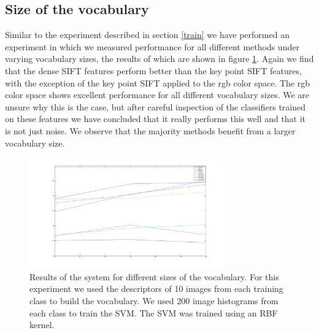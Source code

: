 \documentclass[11pt]{article}
\begin{document}
\subsection{Size of the vocabulary}
Similar to the experiment described in section \ref{train} we have performed an experiment in which we measured performance for all different methods under varying vocabulary sizes, the results of which are shown in figure \ref{vocabularySizes}. Again we find that the dense SIFT features perform better than the key point SIFT features, with the exception of the key point SIFT applied to the rgb color space. The rgb color space shows excellent performance for all different vocabulary sizes. We are unsure why this is the case, but after careful inspection of the classifiers trained on these features we have concluded that it really performs this well and that it is not just noise. We observe that the majority methods benefit from a larger vocabulary size. 
\begin{figure}[H]
  \centering
    \includegraphics[width=0.75\textwidth]{vocabularySizes}
      \caption{Results of the system for different sizes of the vocabulary. For this experiment we used the descriptors of 10 images from each training class to build the vocabulary. We used 200 image histograms from each class to train the SVM. The SVM was trained using an RBF kernel.}
      \label{vocabularySizes}
\end{figure}
\end{document}
